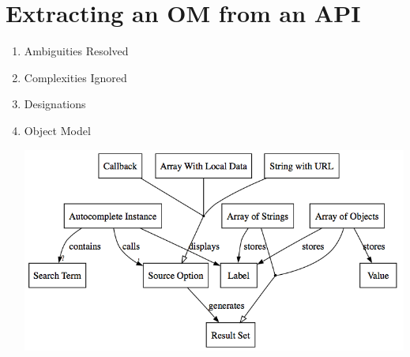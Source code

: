 \documentclass[11pt,letterpaper]{article}
\begin{document}
\section{Extracting an OM from an API}
\begin{enumerate}
\item Ambiguities Resolved\\

\item Complexities Ignored\\

\item Designations\\

\item Object Model\\
\begin{center}
\includegraphics[width=400pt]{dot/autocomplete.png}
\label{fig:ob6} 
\end{center}
\end{enumerate}
\end{document}

